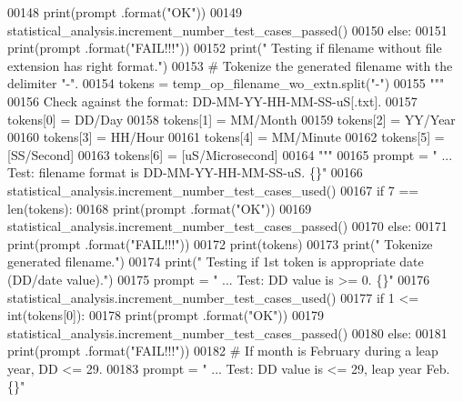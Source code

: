 \begin{DoxyCode}
00148             print(prompt .format(\textcolor{stringliteral}{"OK"}))
00149             statistical\_analysis.increment\_number\_test\_cases\_passed()
00150         \textcolor{keywordflow}{else}:
00151             print(prompt .format(\textcolor{stringliteral}{"FAIL!!!"}))
00152         print(\textcolor{stringliteral}{" Testing if filename without file extension has right format."})
00153         \textcolor{comment}{# Tokenize the generated filename with the delimiter "-".}
00154         tokens = temp\_op\_filename\_wo\_extn.split(\textcolor{stringliteral}{"-"})
00155         \textcolor{stringliteral}{"""}
00156 \textcolor{stringliteral}{            Check against the format: DD-MM-YY-HH-MM-SS-uS[.txt].}
00157 \textcolor{stringliteral}{            tokens[0] = DD/Day}
00158 \textcolor{stringliteral}{            tokens[1] = MM/Month}
00159 \textcolor{stringliteral}{            tokens[2] = YY/Year}
00160 \textcolor{stringliteral}{            tokens[3] = HH/Hour}
00161 \textcolor{stringliteral}{            tokens[4] = MM/Minute}
00162 \textcolor{stringliteral}{            tokens[5] = [SS/Second]}
00163 \textcolor{stringliteral}{            tokens[6] = [uS/Microsecond]}
00164 \textcolor{stringliteral}{        """}
00165         prompt = \textcolor{stringliteral}{"  ... Test: filename format is DD-MM-YY-HH-MM-SS-uS.  \{\}"}
00166         statistical\_analysis.increment\_number\_test\_cases\_used()
00167         \textcolor{keywordflow}{if} 7 == len(tokens):
00168             print(prompt .format(\textcolor{stringliteral}{"OK"}))
00169             statistical\_analysis.increment\_number\_test\_cases\_passed()
00170         \textcolor{keywordflow}{else}:
00171             print(prompt .format(\textcolor{stringliteral}{"FAIL!!!"}))
00172             print(tokens)
00173         print(\textcolor{stringliteral}{" Tokenize generated filename."})
00174         print(\textcolor{stringliteral}{" Testing if 1st token is appropriate date (DD/date value)."})
00175         prompt = \textcolor{stringliteral}{"  ... Test: DD value is >= 0.             \{\}"}
00176         statistical\_analysis.increment\_number\_test\_cases\_used()
00177         \textcolor{keywordflow}{if} 1 <= int(tokens[0]):
00178             print(prompt .format(\textcolor{stringliteral}{"OK"}))
00179             statistical\_analysis.increment\_number\_test\_cases\_passed()
00180         \textcolor{keywordflow}{else}:
00181             print(prompt .format(\textcolor{stringliteral}{"FAIL!!!"}))
00182         \textcolor{comment}{# If month is February during a leap year, DD <= 29.}
00183         prompt = \textcolor{stringliteral}{"  ... Test: DD value is <= 29, leap year Feb.     \{\}"}

\end{DoxyCode}
